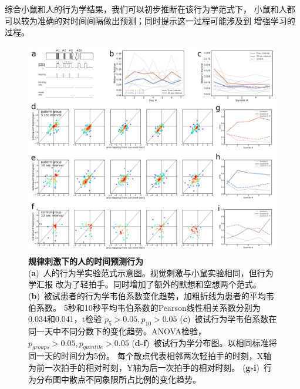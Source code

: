 综合小鼠和人的行为学结果，我们可以初步推断在该行为学范式下，
小鼠和人都可以较为准确的对时间间隔做出预测；同时提示这一过程可能涉及到
增强学习的过程。

\begin{figure}[hp]
    \centering
    \includegraphics[width=\textwidth]{src/figures/human_behavior.pdf}
    \caption{\textbf{规律刺激下的人的时间预测行为}\\
    (\textbf{a})~人的行为学实验范式示意图。视觉刺激与小鼠实验相同，但行为学汇报
    改为了轻拍手。同时增加了额外的默想和空想两个范式。
    (\textbf{b})~被试患者的行为学韦伯系数变化趋势，加粗折线为患者的平均韦伯系数。
    5秒和10秒平均韦伯系数的Pearson线性相关系数分别为0.034和0.041，t检验 $p_5 > 0.05, p_{10} > 0.05$
    (\textbf{c})~被试行为学韦伯系数在同一天中不同分数下的变化趋势。ANOVA检验，$p_{groups} > 0.05, p_{quintile} > 0.05$
    (\textbf{d-f})~被试行为学分布图。以相同标准将同一天的时间分为5份。
    每个散点代表相邻两次轻拍手的时刻，X轴为前一次拍手的相对时刻，Y轴为后一次拍手的相对时刻。
    (\textbf{g-i})~行为分布图中散点不同象限所占比例的变化趋势。}
    \label{fig:human_behavior}
\end{figure}





